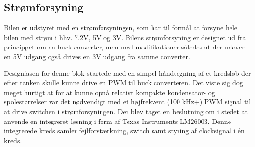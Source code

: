 \subsection{Strømforsyning}\label{sec:hwd_psu}

Bilen er udstyret med en strømforsyningen, som har til formål at forsyne hele bilen med strøm i hhv. 7.2V, 5V og 3V.
Bilens strømforsyning er designet ud fra princippet om en buck converter\cite[s. 326] {lib:analogteknik}, men med modifikationer således at der udover en 5V udgang også drives en 3V udgang fra samme converter.

Designfasen for denne blok startede med en simpel håndtegning af et kredsløb der efter tanken skulle kunne drive en PWM til buck converteren.
Det viste sig dog meget hurtigt at for at kunne opnå relativt kompakte kondensator- og spolestørrelser var det nødvendigt med et højfrekvent (100 kHz+) PWM signal til at drive switchen i strømforsyningen.
Der blev taget en beslutning om i stedet at anvende en integreret løsning i form af Texas Instruments LM26003\cite{lib:lm26003}. 
Denne integrerede kreds samler fejlforstærkning, switch samt styring af clocksignal i én kreds.

